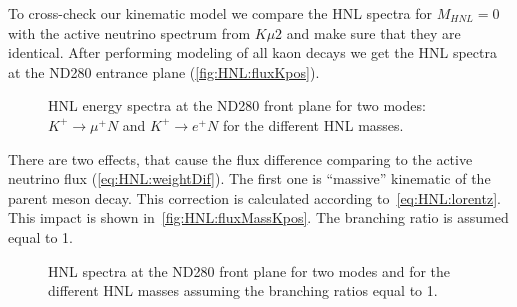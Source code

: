 \documentclass[../main.tex]{subfiles}
\begin{document}
To cross-check our kinematic model we compare the HNL spectra for $M_{HNL}=0$ with the active neutrino spectrum from $K\mu2$ and make sure that they are identical. After performing modeling of all kaon decays we get the HNL spectra at the ND280 entrance plane (\autoref{fig:HNL:fluxKpos}).
\begin{figure}[!ht]
    \begin{minipage}{0.49\linewidth}
    \end{minipage}
    \hfill
    \begin{minipage}{0.49\linewidth}
    \end{minipage}
    \caption{HNL energy spectra at the ND280 front plane for two modes: $K^+\rightarrow \mu^+N$ and $K^+\rightarrow e^+N$ for the different HNL masses.}
    \label{fig:HNL:fluxKpos}
\end{figure}

There are two effects, that cause the flux difference comparing to the active neutrino flux (\autoref{eq:HNL:weightDif}). The first one is ``massive'' kinematic of the parent meson decay. This correction is calculated according to~\autoref{eq:HNL:lorentz}. This impact is shown in~\autoref{fig:HNL:fluxMassKpos}. The branching ratio is assumed equal to 1.
\begin{figure}[!ht]
    \begin{minipage}{0.49\linewidth}
    \end{minipage}
    \hfill
    \begin{minipage}{0.49\linewidth}
    \end{minipage}
    \caption{HNL spectra at the ND280 front plane for two modes and for the different HNL masses assuming the branching ratios equal to 1.}
    \label{fig:HNL:fluxMassKpos}
\end{figure}
\end{document}
